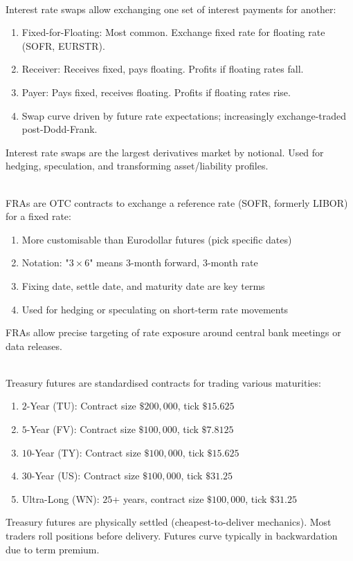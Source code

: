 \documentclass[a4paper,oneside,openany]{book}
\begin{document}
\begin{remark} \\
Interest rate swaps allow exchanging one set of interest payments for another:
\begin{enumerate}[label=\roman*.]
\setlength{\itemsep}{0pt}
\item Fixed-for-Floating: Most common. Exchange fixed rate for floating rate (SOFR, EURSTR).
\item Receiver: Receives fixed, pays floating. Profits if floating rates fall.
\item Payer: Pays fixed, receives floating. Profits if floating rates rise.
\item Swap curve driven by future rate expectations; increasingly exchange-traded post-Dodd-Frank.
\end{enumerate}
Interest rate swaps are the largest derivatives market by notional. Used for hedging, speculation, and transforming asset/liability profiles.
\end{remark}

\begin{remark} \\
FRAs are OTC contracts to exchange a reference rate (SOFR, formerly LIBOR) for a fixed rate:
\begin{enumerate}[label=\roman*.]
\setlength{\itemsep}{0pt}
\item More customisable than Eurodollar futures (pick specific dates)
\item Notation: "$3 \times 6$" means $3$-month forward, $3$-month rate
\item Fixing date, settle date, and maturity date are key terms
\item Used for hedging or speculating on short-term rate movements
\end{enumerate}
FRAs allow precise targeting of rate exposure around central bank meetings or data releases.
\end{remark}

\begin{remark} \\
Treasury futures are standardised contracts for trading various maturities:
\begin{enumerate}[label=\roman*.]
\setlength{\itemsep}{0pt}
\item $2$-Year (TU): Contract size $\$200,000$, tick $\$15.625$
\item $5$-Year (FV): Contract size $\$100,000$, tick $\$7.8125$
\item $10$-Year (TY): Contract size $\$100,000$, tick $\$15.625$
\item $30$-Year (US): Contract size $\$100,000$, tick $\$31.25$
\item Ultra-Long (WN): $25$+ years, contract size $\$100,000$, tick $\$31.25$
\end{enumerate}
Treasury futures are physically settled (cheapest-to-deliver mechanics). Most traders roll positions before delivery. Futures curve typically in backwardation due to term premium.
\end{remark}
\end{document}
